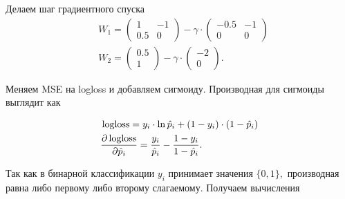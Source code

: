 \begin{sol}
Делаем шаг градиентного спуска
\begin{equation*}
    \begin{aligned} 
      & W_1 = \begin{pmatrix} 1 & -1 \\ 0.5 & 0 \end{pmatrix} - \gamma \cdot \begin{pmatrix} -0.5 & -1 \\ 0 & 0 \end{pmatrix}\\
      & W_2 = \begin{pmatrix} 0.5 \\ 1 \end{pmatrix}  - \gamma \cdot \begin{pmatrix} - 2 \\ 0 \end{pmatrix}.
    \end{aligned}
\end{equation*}

Меняем MSE на logloss и добавляем сигмоиду. Производная для сигмоиды выглядит как 

\begin{equation*}
    \begin{aligned} 
    & \operatorname{logloss} = y_i \cdot \ln \hat p_i + (1 - y_i) \cdot (1 - \hat p_i) \\ 
    & \frac{\partial \operatorname{logloss}}{\partial \hat p_i} = \frac{y_i}{\hat p_i} - \frac{1 - y_i}{1 - \hat p_i}.
    \end{aligned}
\end{equation*}

Так как в бинарной классификации $y_i$ принимает значения $\{0,1\},$ производная равна либо первому либо второму слагаемому. Получаем вычисления 


\end{sol}
